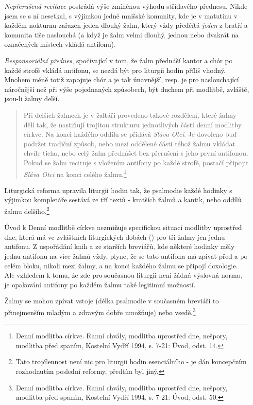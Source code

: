 \emph{Nepřerušená recitace} postrádá výše zmíněnou výhodu střídavého přednesu.
Nikde jsem se s ní nesetkal, s výjimkou jedné mnišské komunity, kde je
v matutinu v každém nokturnu zařazen jeden dlouhý žalm, který vždy předčítá
\emph{jeden} z bratří a komunita tiše naslouchá (a když je žalm velmi dlouhý,
jednou nebo dvakrát na označených místech vkládá antifonu).

\emph{Responsoriální přednes}, spočívající v tom, že žalm přednáší kantor
a chór po každé strofě vkládá antifonu, se nezdá být pro liturgii hodin
příliš vhodný. Mnohem méně totiž zapojuje chór a je tak únavnější,
resp. je pro naslouchající náročnější než při výše pojednaných způsobech,
být duchem při modlitbě, zvláště, jsou-li žalmy delší.

\begin{quote}
Při delších žalmech je v žaltáři provedeno takové rozdělení, které žalmy
dělí tak, že nastiňují trojitou strukturu jednotlivých částí denní modlitby
církve.
Na konci každého oddílu se přidává \emph{Sláva Otci}.
Je dovoleno buď podržet tradiční způsob, nebo mezi oddělené části téhož žalmu
vkládat chvíle ticha, nebo celý žalm přednášet bez přerušení s jeho první
antifonou. Pokud se žalm recituje s vložením antifony po každé strofě,
postačí připojit \emph{Sláva Otci} na konci celého žalmu.\footnote{Denní modlitba církve. Ranní chvály, modlitba uprostřed dne, nešpory, modlitba před spaním, Kostelní Vydří 1994, s. 7-21: Úvod, odst. 14.}
\end{quote}

Liturgická reforma upravila liturgii hodin tak, že psalmodie každé hodinky
s výjimkou kompletáře sestává ze tří textů - kratších žalmů a kantik, nebo
oddílů žalmu delšího.\footnote{Tato trojčlennost není nic pro liturgii hodin
esenciálního - je dán koncepčním rozhodnutím poslední reformy, předtím
byl jiný.}

Úvod k Denní modlitbě církve nezmiňuje specifickou situaci modlitby uprostřed
dne, která má ve zvláštních liturgických dobách (\emph{})
pro tři žalmy jen jednu antifonu. Z uspořádání knih a ze starších breviářů,
kde některé hodinky měly jednu antifonu na více žalmů vždy, plyne,
že se tato antifona má zpívat před a po celém bloku, nikoli mezi žalmy,
a na konci každého žalmu se připojí doxologie. Ale vzhledem k tomu, že
zde pro současnou liturgii není žádná výslovná norma, je opakování antifony
po každém žalmu také legitimní možností.

Žalmy se mohou zpívat vstoje (délka psalmodie v současném breviáři to
přinejmenším mladým a zdravým dobře umožňuje) nebo vsedě.\footnote{Denní modlitba církve. Ranní chvály, modlitba uprostřed dne, nešpory, modlitba před spaním, Kostelní Vydří 1994, s. 7-21: Úvod, odst. 50.}


